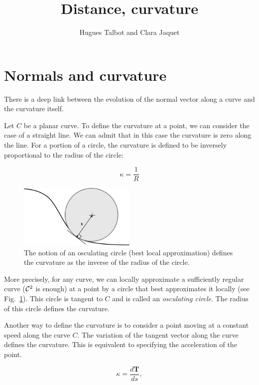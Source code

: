 \documentclass[11pt,a4paper]{article}
\title{Distance, curvature }
\author{Hugues Talbot and Clara Jaquet}
\begin{document}
\maketitle
	
	
	\section{Normals and curvature}
	
	There is a deep link between the evolution of the normal vector along a curve and the curvature itself.
	
	Let $C$ be a planar curve. To define the curvature at a point, we can consider
	the case of a straight line. We can admit that in this case the curvature is zero along the line. For a portion of a circle, the curvature is defined to be inversely proportional to the radius of the circle:
	
	\begin{equation}
	\kappa = \frac{1}{R}
	\end{equation}
	
		\begin{figure}
			\centering
			\includegraphics[width=0.5\textwidth]{Drawings/Osculating.pdf}
			\caption{The notion of an osculating circle (best local approximation) defines the curvature as the inverse of the radius of the circle.\label{fig:oscul}}
		\end{figure}
	
	More precisely, for any curve, we can locally approximate a sufficiently regular curve (${\cal C}^2$ is enough) at a point by a circle that best approximates it locally (see Fig.~\ref{fig:oscul}). This circle is tangent to $C$ and is called an {\em osculating circle}. The radius of this circle defines the curvature.
	

	
	Another way to define the curvature is to consider a point moving at a constant speed along the curve $C$. The variation of the tangent vector along the curve defines the curvature. This is equivalent to specifying the acceleration of the point.
	
	
	\begin{equation}
	\kappa = \frac{d \mathbf{T}}{ds},
	\end{equation}
	
\end{document}
